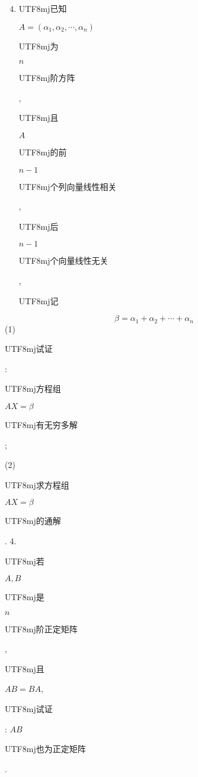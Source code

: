 \documentclass[10pt]{article}
\begin{document}
\begin{enumerate}
  \setcounter{enumi}{3}
  \item \begin{CJK}{UTF8}{mj}已知\end{CJK} $A=\left(\alpha_{1}, \alpha_{2}, \cdots, \alpha_{n}\right)$ \begin{CJK}{UTF8}{mj}为\end{CJK} $n$ \begin{CJK}{UTF8}{mj}阶方阵\end{CJK}, \begin{CJK}{UTF8}{mj}且\end{CJK} $A$ \begin{CJK}{UTF8}{mj}的前\end{CJK} $n-1$ \begin{CJK}{UTF8}{mj}个列向量线性相关\end{CJK}, \begin{CJK}{UTF8}{mj}后\end{CJK} $n-1$ \begin{CJK}{UTF8}{mj}个向量线性无关\end{CJK}, \begin{CJK}{UTF8}{mj}记\end{CJK}
\end{enumerate}
$$
\beta=\alpha_{1}+\alpha_{2}+\cdots+\alpha_{n}
$$
(1) \begin{CJK}{UTF8}{mj}试证\end{CJK}: \begin{CJK}{UTF8}{mj}方程组\end{CJK} $A X=\beta$ \begin{CJK}{UTF8}{mj}有无穷多解\end{CJK};

(2) \begin{CJK}{UTF8}{mj}求方程组\end{CJK} $A X=\beta$ \begin{CJK}{UTF8}{mj}的通解\end{CJK}. 4. \begin{CJK}{UTF8}{mj}若\end{CJK} $A, B$ \begin{CJK}{UTF8}{mj}是\end{CJK} $n$ \begin{CJK}{UTF8}{mj}阶正定矩阵\end{CJK}, \begin{CJK}{UTF8}{mj}且\end{CJK} $A B=B A$, \begin{CJK}{UTF8}{mj}试证\end{CJK}: $A B$ \begin{CJK}{UTF8}{mj}也为正定矩阵\end{CJK}.
\end{document}
